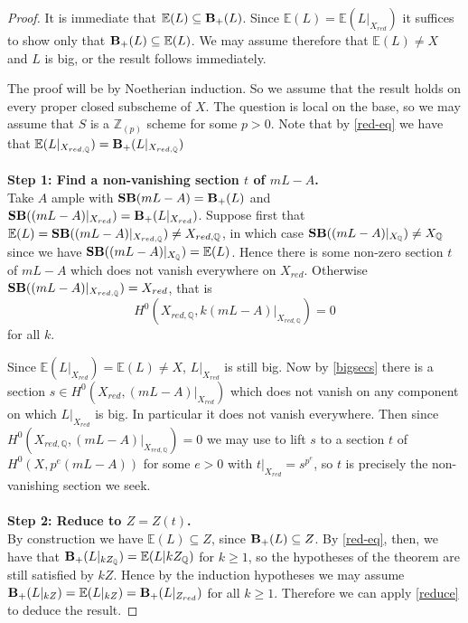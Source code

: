 \begin{proof}
	
	It is immediate that $\mathbb{E}(L)\subseteq \mathbf{B}_{+}(L)$. Since $\mathbb{E}(L)=\mathbb{E}(L|_{X_{red}})$ it suffices to show only that $\mathbf{B}_{+}(L) \subseteq \mathbb{E}(L)$. We may assume therefore that $\mathbb{E}(L) \neq X$ and $L$  is big, or the result follows immediately.
	
	The proof will be by Noetherian induction. So we assume that the result holds on every proper closed subscheme of $X$. The question is local on the base, so we may assume that $S$ is a $\mathbb{Z}_{(p)}$ scheme for some $p > 0$. Note that by \autoref{red-eq} we have that $\mathbb{E}(L|_{X_{red,\mathbb{Q}}})=\mathbf{B}_{+}(L|_{X_{red,\mathbb{Q}}})$\\
	\\
	\textbf{Step 1: Find a non-vanishing section $t$ of $mL-A$.}\\
	
	Take $A$ ample with $\mathbf{SB}(mL-A)=\mathbf{B}_{+}(L)$ and $\mathbf{SB}((mL-A)|_{X_{red}})=\mathbf{B}_{+}(L|_{X_{red}})$. Suppose first that $\mathbb{E}(L)=\mathbf{SB}((mL-A)|_{X_{red,\mathbb{Q}}}) \neq X_{red,\mathbb{Q}}$, in which case $\mathbf{SB}((mL-A)|_{X_{\mathbb{Q}}}) \neq X_{\mathbb{Q}}$ since we have $\mathbf{SB}((mL-A)|_{X_{\mathbb{Q}}})=\mathbb{E}(L)$. Hence there is some non-zero section $t$ of $mL-A$ which does not vanish everywhere on $X_{red}$. Otherwise $\mathbf{SB}((mL-A)|_{X_{red,\mathbb{Q}}}) = X_{red}$, that is $$H^{0}(X_{red,\mathbb{Q}},k(mL-A)|_{X_{red,\mathbb{Q}}}) =0$$ for all $k$. 
	
	Since $\mathbb{E}(L|_{X_{red}})=\mathbb{E}(L) \neq X$, $L|_{X_{red}}$ is still big. Now by \autoref{bigsecs} there is a section $s\in H^{0}(X_{red},(mL-A)|_{X_{red}})$ which does not vanish on any component on which $L|_{X_{red}}$ is big. In particular it does not vanish everywhere. Then since $H^{0}(X_{red,\mathbb{Q}},(mL-A)|_{X_{red,\mathbb{Q}}}) =0$ we may use \cite[Proposition 3.5]{witaszek2020keels} to lift $s$ to a section $t$ of $H^{0}(X,p^{e}(mL-A))$ for some $e > 0$ with $t|_{X_{red}}=s^{p^{e}}$, so $t$ is precisely the non-vanishing section we seek.\\
	\\
	\textbf{Step 2: Reduce to $Z=Z(t)$.}\\
	
	By construction we have $\mathbb{E}(L)\subseteq Z$, since $\mathbf{B}_{+}(L) \subseteq Z$. By \autoref{red-eq}, then, we have that $\mathbf{B}_{+}(L|_{kZ_{\mathbb{Q}}})=\mathbb{E}(L|{kZ_{\mathbb{Q}}})$ for $k \geq 1$, so the hypotheses of the theorem are still satisfied by $kZ$. Hence by the induction hypotheses we may assume $\mathbf{B}_{+}(L|_{kZ})=\mathbb{E}(L|_{kZ})=\mathbf{B}_{+}(L|_{Z_{red}})$ for all $k \geq 1$. Therefore we can apply \autoref{reduce} to deduce the result.
\end{proof}

